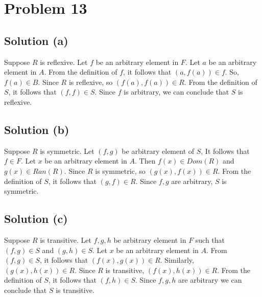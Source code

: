 \documentclass{article}
\begin{document}
\section{Problem 13}
\subsection{Solution (a)}
Suppose $R$ is reflexive. Let $f$ be an arbitrary element in $F$. Let
$a$ be an arbitrary element in $A$. From the definition of $f$, it
follows that $(a,f(a)) \in f$. So, $f(a) \in B$. Since $R$ is
reflexive, so $(f(a),f(a)) \in R$. From the definition of $S$, it
follows that $(f,f) \in S$. Since $f$ is arbitrary, we can conclude
that $S$ is reflexive.
  
\subsection{Solution (b)}
Suppose $R$ is symmetric. Let $(f,g)$ be arbitrary element of $S$, It
follows that $f \in F$. Let $x$ be an arbitrary element in $A$. Then
$f(x) \in Dom(R)$ and $g(x) \in Ran(R)$. Since $R$ is symmetric, so
$(g(x),f(x)) \in R$. From the definition of $S$, it follows that
$(g,f) \in R$. Since $f,g$ are arbitrary, $S$ is symmetric.

\subsection{Solution (c)}
Suppose $R$ is transitive. Let $f,g,h$ be arbitrary element in $F$
such that $(f,g) \in S$ and $(g,h) \in S$. Let $x$ be an arbitrary
element in $A$. From $(f,g) \in S$, it follows that
$(f(x),g(x)) \in R$. Similarly, $(g(x),h(x)) \in R$. Since $R$ is
transitive, $(f(x),h(x)) \in R$. From the definition of $S$, it
follows that $(f,h) \in S$. Since $f,g,h$ are arbitrary we can
conclude that $S$ is transitive.
\end{document}
